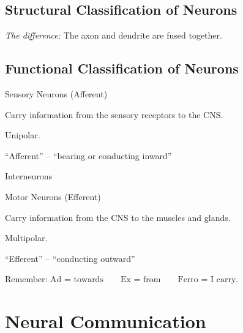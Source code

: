 \subsection{Structural Classification of Neurons}

\begin{coloredlist}
    \item {}
    \begin{coloredlist}
        \item \textit{The difference:} The axon and dendrite are fused together.
    \end{coloredlist}
    \item {}
    \item {}
\end{coloredlist}

\subsection{Functional Classification of Neurons}

\begin{coloredlist}
    \item Sensory Neurons (Afferent)
    \begin{coloredlist}
        \item Carry information from the sensory receptors to the CNS.
        \item Unipolar.
        \item ``Afferent'' -- ``bearing or conducting inward''
    \end{coloredlist}
    \item Interneurons
    \item Motor Neurons (Efferent)
    \begin{coloredlist}
        \item Carry information from the CNS to the muscles and glands.
        \item Multipolar.
        \item ``Efferent'' -- ``conducting outward''
    \end{coloredlist}
    \item Remember: \(\text{Ad = towards} \qquad \text{Ex = from} \qquad \text{Ferro = I carry}.\)
\end{coloredlist}

\section{Neural Communication}

